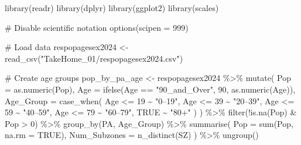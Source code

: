 \documentclass[
  letterpaper,
  DIV=11,
  numbers=noendperiod]{scrartcl}
\newenvironment{Shaded}{\begin{snugshade}}{\end{snugshade}}
\newcommand{\AttributeTok}[1]{\textcolor[rgb]{0.40,0.45,0.13}{#1}}
\newcommand{\CommentTok}[1]{\textcolor[rgb]{0.37,0.37,0.37}{#1}}
\newcommand{\ConstantTok}[1]{\textcolor[rgb]{0.56,0.35,0.01}{#1}}
\newcommand{\DecValTok}[1]{\textcolor[rgb]{0.68,0.00,0.00}{#1}}
\newcommand{\FunctionTok}[1]{\textcolor[rgb]{0.28,0.35,0.67}{#1}}
\newcommand{\NormalTok}[1]{\textcolor[rgb]{0.00,0.23,0.31}{#1}}
\newcommand{\OtherTok}[1]{\textcolor[rgb]{0.00,0.23,0.31}{#1}}
\newcommand{\SpecialCharTok}[1]{\textcolor[rgb]{0.37,0.37,0.37}{#1}}
\newcommand{\StringTok}[1]{\textcolor[rgb]{0.13,0.47,0.30}{#1}}
\begin{document}
\begin{Shaded}
\begin{Highlighting}[]
\FunctionTok{library}\NormalTok{(readr)}
\FunctionTok{library}\NormalTok{(dplyr)}
\FunctionTok{library}\NormalTok{(ggplot2)}
\FunctionTok{library}\NormalTok{(scales)}

\CommentTok{\# Disable scientific notation}
\FunctionTok{options}\NormalTok{(}\AttributeTok{scipen =} \DecValTok{999}\NormalTok{)}

\CommentTok{\# Load data}
\NormalTok{respopagesex2024 }\OtherTok{\textless{}{-}} \FunctionTok{read\_csv}\NormalTok{(}\StringTok{"TakeHome\_01/respopagesex2024.csv"}\NormalTok{)}

\CommentTok{\# Create age groups}
\NormalTok{pop\_by\_pa\_age }\OtherTok{\textless{}{-}}\NormalTok{ respopagesex2024 }\SpecialCharTok{\%\textgreater{}\%}
  \FunctionTok{mutate}\NormalTok{(}
    \AttributeTok{Pop =} \FunctionTok{as.numeric}\NormalTok{(Pop),}
    \AttributeTok{Age =} \FunctionTok{ifelse}\NormalTok{(Age }\SpecialCharTok{==} \StringTok{"90\_and\_Over"}\NormalTok{, }\DecValTok{90}\NormalTok{, }\FunctionTok{as.numeric}\NormalTok{(Age)),}
    \AttributeTok{Age\_Group =} \FunctionTok{case\_when}\NormalTok{(}
\NormalTok{      Age }\SpecialCharTok{\textless{}=} \DecValTok{19} \SpecialCharTok{\textasciitilde{}} \StringTok{"0–19"}\NormalTok{,}
\NormalTok{      Age }\SpecialCharTok{\textless{}=} \DecValTok{39} \SpecialCharTok{\textasciitilde{}} \StringTok{"20–39"}\NormalTok{,}
\NormalTok{      Age }\SpecialCharTok{\textless{}=} \DecValTok{59} \SpecialCharTok{\textasciitilde{}} \StringTok{"40–59"}\NormalTok{,}
\NormalTok{      Age }\SpecialCharTok{\textless{}=} \DecValTok{79} \SpecialCharTok{\textasciitilde{}} \StringTok{"60–79"}\NormalTok{,}
      \ConstantTok{TRUE} \SpecialCharTok{\textasciitilde{}} \StringTok{"80+"}
\NormalTok{    )}
\NormalTok{  ) }\SpecialCharTok{\%\textgreater{}\%}
  \FunctionTok{filter}\NormalTok{(}\SpecialCharTok{!}\FunctionTok{is.na}\NormalTok{(Pop) }\SpecialCharTok{\&}\NormalTok{ Pop }\SpecialCharTok{\textgreater{}} \DecValTok{0}\NormalTok{) }\SpecialCharTok{\%\textgreater{}\%}
  \FunctionTok{group\_by}\NormalTok{(PA, Age\_Group) }\SpecialCharTok{\%\textgreater{}\%}
  \FunctionTok{summarise}\NormalTok{(}
    \AttributeTok{Pop =} \FunctionTok{sum}\NormalTok{(Pop, }\AttributeTok{na.rm =} \ConstantTok{TRUE}\NormalTok{),}
    \AttributeTok{Num\_Subzones =} \FunctionTok{n\_distinct}\NormalTok{(SZ)}
\NormalTok{  ) }\SpecialCharTok{\%\textgreater{}\%}
  \FunctionTok{ungroup}\NormalTok{()}


\end{Highlighting}
\end{Shaded}
\end{document}
